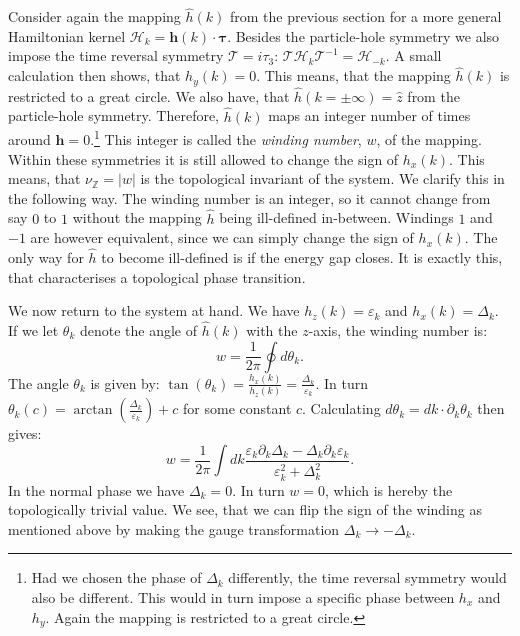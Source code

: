 Consider again the mapping $\hat{h}(k)$ from the previous section for a more general Hamiltonian kernel $\mathcal{H}_k = \mathbf{h}(k)\cdot\boldsymbol\tau$. Besides the particle-hole symmetry we also impose the time reversal symmetry $\mathcal{T} = i\tau_3$: $\mathcal{T}\mathcal{H}_k\mathcal{T}^{-1} = \mathcal{H}_{-k}$. A small calculation then shows, that $h_y(k) = 0$. This means, that the mapping $\hat{h}(k)$ is restricted to a great circle. We also have, that $\hat{h}(k = \pm \infty) = \hat{z}$ from the particle-hole symmetry. Therefore, $\hat{h}(k)$ maps an integer number of times around $\mathbf{h} = 0$.\footnote{Had we chosen the phase of $\Delta_k$ differently, the time reversal symmetry would also be different. This would in turn impose a specific phase between $h_x$ and $h_y$. Again the mapping is restricted to a great circle.} This integer is called the \textit{winding number}, $w$, of the mapping. Within these symmetries it is still allowed to change the sign of $h_x(k)$. This means, that $\nu_{\mathbb{Z}} = |w|$ is the topological invariant of the system. We clarify this in the following way. The winding number is an integer, so it cannot change from say $0$ to $1$ without the mapping $\hat{h}$ being ill-defined in-between. Windings $1$ and $-1$ are however equivalent, since we can simply change the sign of $h_x(k)$. The only way for $\hat{h}$ to become ill-defined is if the energy gap closes. It is exactly this, that characterises a topological phase transition. 

We now return to the system at hand. We have $h_z(k) = \varepsilon_k$ and $h_x(k) = \Delta_k$. If we let $\theta_k$ denote the angle of $\hat{h}(k)$ with the $z$-axis, the winding number is:
\begin{equation}
w = \frac{1}{2\pi}\oint d\theta_k.
\label{eq.definition.windingnumber}
\end{equation} 
The angle $\theta_k$ is given by: $\tan(\theta_k) = \frac{h_x(k)}{h_z(k)} = \frac{\Delta_k}{\varepsilon_k}$. In turn $\theta_k(c) = \arctan\left(\frac{\Delta_k}{\varepsilon_k}\right) + c$ for some constant $c$. Calculating $d\theta_k = dk \cdot \partial_k \theta_k$ then gives:
\begin{equation}
w = \frac{1}{2\pi}\int dk \frac{\varepsilon_k\partial_k\Delta_k - \Delta_k\partial_k\varepsilon_k}{\varepsilon^2_k + \Delta^2_k}. \nonumber
\end{equation} 
In the normal phase we have $\Delta_k = 0$. In turn $w = 0$, which is hereby the topologically trivial value. We see, that we can flip the sign of the winding as mentioned above by making the gauge transformation $\Delta_k \to - \Delta_k$. 

